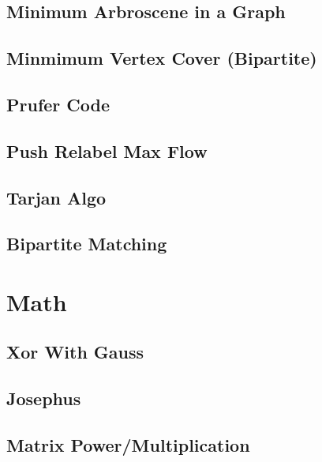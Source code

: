 \subsection{Minimum Arbroscene in a Graph}
\raggedbottom
\hrulefill
\subsection{Minmimum Vertex Cover (Bipartite)}
\raggedbottom
\hrulefill
\subsection{Prufer Code}
\raggedbottom
\hrulefill
\subsection{Push Relabel Max Flow}
\raggedbottom
\hrulefill
\subsection{Tarjan Algo}
\raggedbottom
\hrulefill
\subsection{Bipartite Matching}
\raggedbottom
\hrulefill

\section{Math}
\subsection{Xor With Gauss}
\raggedbottom
\hrulefill
\subsection{Josephus}
\raggedbottom
\hrulefill
\subsection{Matrix Power/Multiplication}
\raggedbottom
\hrulefill
